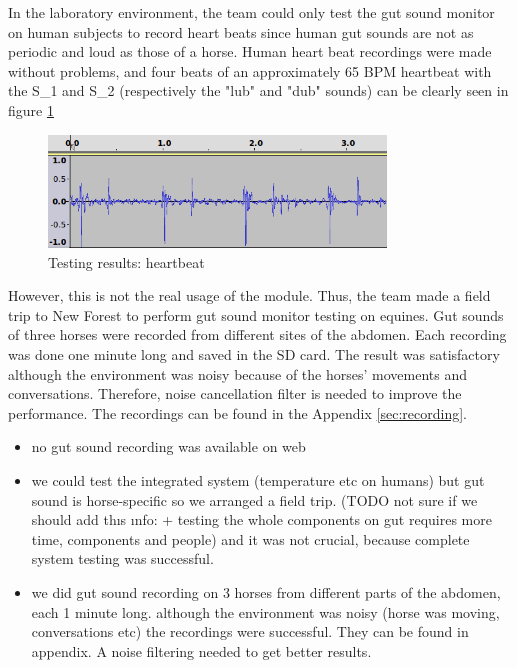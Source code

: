 In the laboratory environment, the team could only test the gut sound monitor on human subjects to record heart beats since human gut sounds are not as periodic and loud as those of a horse. Human heart beat recordings were made without problems, and four beats of an approximately 65 BPM heartbeat with the S\_1 and S\_2 (respectively the "lub" and "dub" sounds) can be clearly seen in figure \ref{fig:heartbeat}

\begin{figure}
\centering
\includegraphics[width=0.8\textwidth]{Images/heartbeat.png}
\caption{Testing results: heartbeat}
\label{fig:heartbeat}
\end{figure}

However, this is not the real usage of the module. Thus, the team made a field trip to New Forest to perform gut sound monitor testing on equines. Gut sounds of three horses were recorded from different sites of the abdomen. Each recording was done one minute long and saved in the SD card. The result was satisfactory although the environment was noisy because of the horses' movements and conversations. Therefore, noise cancellation filter is needed to improve the performance. The recordings can be found in the Appendix \ref{sec:recording}.

\begin{itemize}
\item no gut sound recording was available on web
\item we could test the integrated system (temperature etc on humans) but gut sound is horse-specific so we arranged a field trip. (TODO{} not sure if we should add thıs ınfo: + testing the whole components on gut requires more time, components and people) and it was not crucial, because complete system testing was successful.
\item we did gut sound recording on 3 horses from different parts of the abdomen, each 1 minute long. although the environment was noisy (horse was moving, conversations etc) the recordings were successful. They can be found in appendix. A noise filtering needed to get better results.
\end{itemize}


